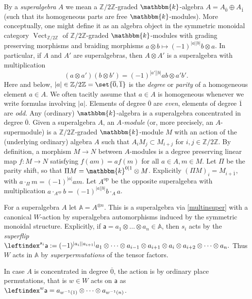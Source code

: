 \documentclass[a4paper,11pt]{amsart}
\let\ov\overline
\numberwithin{equation}{subsection}
\theoremstyle{definition}
\theoremstyle{theorem}
\theoremstyle{remark}
\newcommand\Sym{W}
\newcommand\Ztwo{\mathbb{Z}/2\mathbb{Z}}
\newcommand\ba{\mathsf{a}}
\newcommand\op{\operatorname}
\newcommand\kk{\mathbbm{k}}
\newcommand\Z{\mathbb{Z}}
\newcommand{\Ao}{\mathbb{A}}
\begin{document}
By a \emph{superalgebra} $A$ we mean a $\Ztwo$-graded $\kk$-algebra $A=A_{\ov0}\oplus A_{\ov1}$ (such that its homogeneous parts are free $\kk$-modules). More conceptually, one might define it  as an algebra object in the symmetric monoidal category $\op{Vect}_{\Ztwo}$ of $\Ztwo$-graded $\kk$-modules with grading preserving morphisms and braiding morphisms $a\otimes b\mapsto (-1)^{|a||b|}b\otimes a$.
In particular,  if $A$ and $A'$ are superalgebras, then $A\otimes A'$ is a superalgebra with multiplication
 \begin{equation}\label{multinsuper}
 (a\otimes a') (b\otimes b')=(-1)^{|a'||b|}ab\otimes a'b'.
  \end{equation}
  Here and below, $|a|\in\Ztwo=\set{\ov0,\ov1}$ is the \emph{degree} or
  \emph{parity} of a homogeneous element $a\in A$. We often tacitly
  assume that $a\in A$ is homogeneous whenever we write formulas involving $|a|$. Elements of degree $\ov{0}$ are \emph{even}, elements of degree  $\ov{1}$ are \emph{odd}.  Any (ordinary) $\kk$-algebra is a superalgebra concentrated in degree $\ov0$.
Given a superalgebra $A$, an \emph{$A$-module} (or, more precisely, an $A$-supermodule) is a $\Ztwo$-graded $\kk$-module $M$ with an action of the (underlying ordinary) algebra $A$ such that $A_{i}M_{j}\subset M_{i+j}$ for $i,j\in\Z/2\Z$.  By definition, a morphism $M\rightarrow N$ between $A$-modules is a degree preserving linear map $f\colon M\rightarrow N$ satisfying $f(am)=a f(m)$ for all $a\in A, m\in M$.
Let $\Pi$ be the parity shift, so that $\Pi M=\kk^{0|1}\otimes M$. Explicitly $(\Pi M)_i=M_{i+\bar 1}$, with
$a\cdot_\Pi m=(-1)^{|a|}am$. Let $A^{\mathrm{op}}$ be the opposite superalgebra with multiplication $a\cdot_{A^{\mathrm{op}}}b=(-1)^{|a||b|}b\cdot_Aa$.

     \begin{Definition}\label{Symaction}
For a superalgebra $A$ let $\Ao= A^{\otimes n}$. This is a superalgebra via \autoref{multinsuper} with a canonical $\Sym$-action by superalgebra automorphisms induced by the symmetric monoidal structure.
Explicitly, if $\ba=a_1\otimes\dots\otimes a_n\in\Ao$, then $s_i$ acts by the \emph{superflip} $\leftindex^{s_i}\ba:=(-1)^{|a_i||a_{i+1}|}a_1\otimes\dots\otimes a_{i-1}\otimes a_{i+1}\otimes a_i\otimes a_{i+2}\otimes\dots\otimes a_n.$ Thus $\Sym$ acts in $\Ao$ by \emph{superpermutations} of the tensor factors.

In case $A$ is concentrated in degree $\ov0$,  the action is
by ordinary place permutations, that is $w\in\Sym$ acts on $\ba$ as  $\leftindex^w\ba=a_{w^{-1}(1)}\otimes\dots\otimes
  a_{w^{-1}(n)}$.
  \end{Definition}
\end{document}
